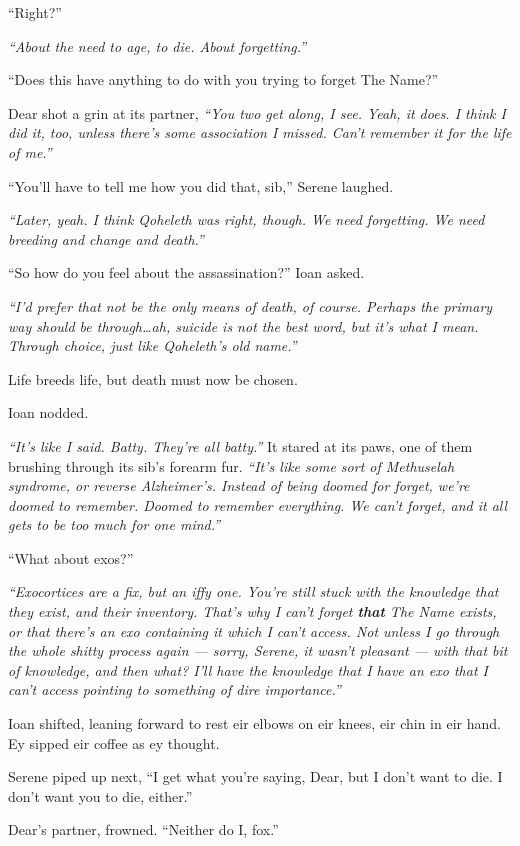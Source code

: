 ``Right?''

\emph{``About the need to age, to die. About forgetting.''}

``Does this have anything to do with you trying to forget The Name?''

Dear shot a grin at its partner, \emph{``You two get along, I see. Yeah, it does. I think I did it, too, unless there's some association I missed. Can't remember it for the life of me.''}

``You'll have to tell me how you did that, sib,'' Serene laughed.

\emph{``Later, yeah. I think Qoheleth was right, though. We need forgetting. We need breeding and change and death.''}

``So how do you feel about the assassination?'' Ioan asked.

\emph{``I'd prefer that not be the only means of death, of course. Perhaps the primary way should be through\ldots{}ah, suicide is not the best word, but it's what I mean. Through choice, just like Qoheleth's old name.''}

Life breeds life, but death must now be chosen.

Ioan nodded.

\emph{``It's like I said. Batty. They're all batty.''} It stared at its paws, one of them brushing through its sib's forearm fur. \emph{``It's like some sort of Methuselah syndrome, or reverse Alzheimer's. Instead of being doomed for forget, we're doomed to remember. Doomed to remember everything. We can't forget, and it all gets to be too much for one mind.''}

``What about exos?''

\emph{``Exocortices are a fix, but an iffy one. You're still stuck with the knowledge that they exist, and their inventory. That's why I can't forget \textbf{that} The Name exists, or that there's an exo containing it which I can't access. Not unless I go through the whole shitty process again --- sorry, Serene, it wasn't pleasant --- with that bit of knowledge, and then what? I'll have the knowledge that I have an exo that I can't access pointing to something of dire importance.''}

Ioan shifted, leaning forward to rest eir elbows on eir knees, eir chin in eir hand. Ey sipped eir coffee as ey thought.

Serene piped up next, ``I get what you're saying, Dear, but I don't want to die. I don't want you to die, either.''

Dear's partner, frowned. ``Neither do I, fox.''

